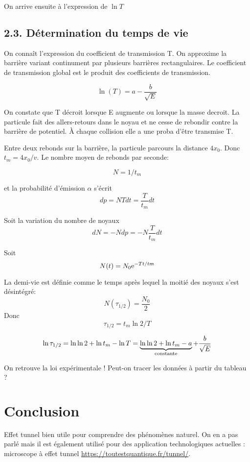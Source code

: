 \documentclass[french, a4paper, 10pt, twocolumn, landscape]{article}
\begin{document}
On arrive ensuite à l'expression de $\ln{T}$

\subsection*{2.3. Détermination du temps de vie}

On connaît l'expression du coefficient de transmission T. On approxime la barrière variant continument par plusieurs barrières rectangulaires. Le coefficient de transmission global  est le produit des coefficients de transmission. 

\begin{equation}
    \ln(T)=a-\dfrac{b}{\sqrt{E}}
\end{equation}

On constate que T décroit lorsque E augmente ou lorsque la masse decroit. La particule fait des allers-retours dans le noyau et ne cesse de rebondir contre la barrière de potentiel. À chaque collision elle a une proba d'être transmise T. 

Entre deux rebonds sur la barrière, la particule parcours la distance $4x_0$. Donc $t_m = 4x_0/v$. Le nombre moyen de rebonds par seconde:

$$N=1/t_m$$

et la probabilité d'émission $\alpha$ s'écrit $$dp=NTdt = \dfrac{T}{t_m}dt$$

Soit la variation du nombre de noyaux $$dN=-Ndp=-N\dfrac{T}{t_m}dt$$

Soit $$N(t) = N_0{\rm e}^{-Tt/tm}$$

La demi-vie est définie comme le temps après lequel la moitié des noyaux s'est désintégré: $$N(\tau_{1/2})=\dfrac{N_0}{2}$$
Donc $$\tau_{1/2}=t_m\ln{2}/T$$

 $$\ln{\tau_{1/2}}=\ln\ln 2+\ln t_m-\ln T = \underbrace{\ln\ln 2+\ln t_m-a}_{\rm constante}+\dfrac{b}{\sqrt{E}}$$

 On retrouve la loi expérimentale !  Peut-on tracer les données à partir du tableau ? 

 \section*{Conclusion}

 Effet tunnel bien utile pour comprendre des phénomènes naturel. On en a pas parlé mais il est également utilisé pour des application technologiques actuelles : microscope à effet tunnel \url{https://toutestquantique.fr/tunnel/}.
\end{document}
